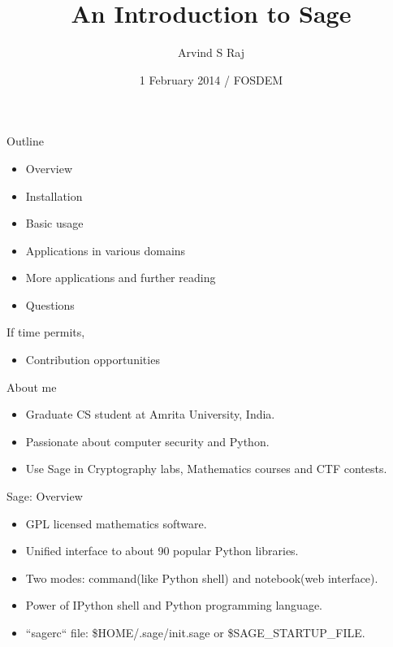 \documentclass{beamer}
\title{An Introduction to Sage}
\author[Arvind]
{Arvind S Raj}
\institute[Amrita]
{
  Department of Cybersecurity Systems and Networks\\
  Amrita University, India
}
\date[FOSDEM 2014]
{1 February 2014 / FOSDEM}
\begin{document}
\begin{frame}
  \titlepage
\end{frame}

\begin{frame}{Outline}
  \begin{itemize}
   \item Overview
   \item Installation
   \item Basic usage
   \item Applications in various domains
   \item More applications and further reading
   \item Questions
  \end{itemize}
  If time permits,
  \begin{itemize}
   \item Contribution opportunities
  \end{itemize}
\end{frame}

\begin{frame}{About me}
  \begin{itemize}
    \item Graduate CS student at Amrita University, India.
    \item Passionate about computer security and Python.
    \item Use Sage in Cryptography labs, Mathematics courses and CTF contests.
  \end{itemize}
\end{frame}

\begin{frame}{Sage: Overview}
  \begin{itemize}
   \item GPL licensed mathematics software.
   \item Unified interface to about 90 popular Python libraries.
   \item Two modes: command(like Python shell) and notebook(web interface).
   \item Power of IPython shell and Python programming language.
   \item ``sagerc`` file: \$HOME/.sage/init.sage or \$SAGE\_STARTUP\_FILE.
  \end{itemize}
\end{frame}
\end{document}
